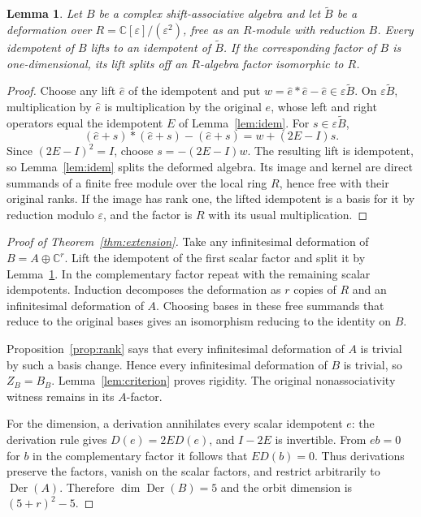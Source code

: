 \documentclass[11pt]{article}
\newtheorem{lemma}[theorem]{Lemma}
\theoremstyle{remark}
\newcommand{\C}{\mathbb C}
\newcommand{\Der}{\operatorname{Der}}
\begin{document}
\begin{lemma}\label{lem:lift}
Let $B$ be a complex shift-associative algebra and let $\widetilde B$ be a deformation over $R=\C[\varepsilon]/(\varepsilon^2)$, free as an $R$-module with reduction $B$. Every idempotent of $B$ lifts to an idempotent of $\widetilde B$. If the corresponding factor of $B$ is one-dimensional, its lift splits off an $R$-algebra factor isomorphic to $R$.
\end{lemma}
\begin{proof}
Choose any lift $\widehat e$ of the idempotent and put $w=\widehat e*\widehat e-\widehat e\in\varepsilon\widetilde B$. On $\varepsilon\widetilde B$, multiplication by $\widehat e$ is multiplication by the original $e$, whose left and right operators equal the idempotent $E$ of Lemma~\ref{lem:idem}. For $s\in\varepsilon\widetilde B$,
\[
 (\widehat e+s)*(\widehat e+s)-(\widehat e+s)=w+(2E-I)s.
\]
Since $(2E-I)^2=I$, choose $s=-(2E-I)w$. The resulting lift is idempotent, so Lemma~\ref{lem:idem} splits the deformed algebra. Its image and kernel are direct summands of a finite free module over the local ring $R$, hence free with their original ranks. If the image has rank one, the lifted idempotent is a basis for it by reduction modulo $\varepsilon$, and the factor is $R$ with its usual multiplication.
\end{proof}

\begin{proof}[Proof of Theorem~\ref{thm:extension}]
Take any infinitesimal deformation of $B=A\oplus\C^r$. Lift the idempotent of the first scalar factor and split it by Lemma~\ref{lem:lift}. In the complementary factor repeat with the remaining scalar idempotents. Induction decomposes the deformation as $r$ copies of $R$ and an infinitesimal deformation of $A$. Choosing bases in these free summands that reduce to the original bases gives an isomorphism reducing to the identity on $B$.

Proposition~\ref{prop:rank} says that every infinitesimal deformation of $A$ is trivial by such a basis change. Hence every infinitesimal deformation of $B$ is trivial, so $Z_B=B_B$. Lemma~\ref{lem:criterion} proves rigidity. The original nonassociativity witness remains in its $A$-factor.

For the dimension, a derivation annihilates every scalar idempotent $e$: the derivation rule gives $D(e)=2E D(e)$, and $I-2E$ is invertible. From $eb=0$ for $b$ in the complementary factor it follows that $E D(b)=0$. Thus derivations preserve the factors, vanish on the scalar factors, and restrict arbitrarily to $\Der(A)$. Therefore $\dim\Der(B)=5$ and the orbit dimension is $(5+r)^2-5$.
\end{proof}
\end{document}
